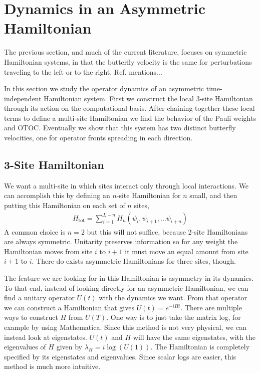 \section{Dynamics in an Asymmetric Hamiltonian} \label{sec:asymham}

The previous section, and much of the current literature, focuses on symmetric Hamiltonian systems, in that the butterfly velocity is the same for perturbations traveling to the left or to the right. Ref.\cite{??} mentions...

In this section we study the operator dynamics of an asymmetric time-independent Hamiltonian system. First we construct the local 3-site Hamiltonian through its action on the computational basis. 
After chaining together these local terms to define a multi-site Hamiltonian we find the behavior of the Pauli weights and OTOC. Eventually we show that this system has two distinct butterfly velocities, one for operator fronts spreading in each direction.

\subsection{3-Site Hamiltonian}  \label{sub:hamiltonian}

We want a multi-site in which sites interact only through local interactions. We can accomplish this by defining an $n$-site Hamiltonian for $n$ small, and then putting this Hamiltonian on each set of $n$ sites,
\begin{align}
H_{\text{tot}} = \sum_{i=1}^{L-n}H_n(\psi_i,\psi_{i+1},\dots\psi_{i+n})
 \label{eqn:chain}
\end{align}
A common choice is $n=2$ but this will not suffice, because 2-site Hamiltonians are always symmetric. Unitarity preserves information so for any weight the Hamiltonian moves from site $i$ to $i+1$ it must move an equal amount from site $i+1$ to $i$. There do exists asymmetric Hamiltonians for three sites, though. 

The feature we are looking for in this Hamiltonian is asymmetry in its dynamics. To that end, instead of looking directly for an asymmetric Hamiltonian, we can find a unitary operator $U(t)$ with the dynamics we want. From that operator we can construct a Hamiltonian that gives $U(t)=e^{-iHt}$. There are multiple ways to construct $H$ from $U(T)$. One way is to just take the matrix log, for example by using Mathematica. Since this method is not very physical, we can instead look at eigenstates. $U(t)$ and $H$ will have the same eigenstates, with the eigenvalues of $H$ given by $\lambda_H = i\log(U(1))$. The Hamiltonian is completely specified by its eigenstates and eigenvalues. Since scalar logs are easier, this method is much more intuitive.

